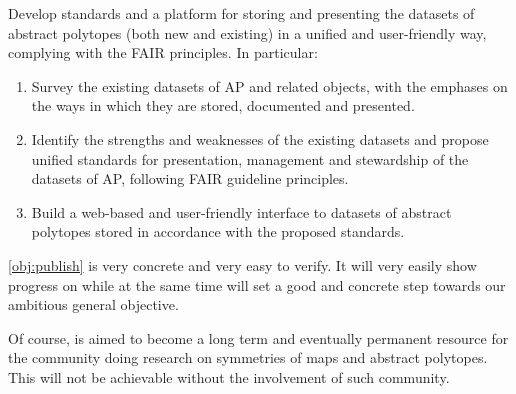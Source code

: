 \begin{obj}\label{obj:publish}
Develop standards and a platform for storing and presenting the datasets of abstract polytopes
 (both new and existing) in a unified and user-friendly way, complying with the FAIR principles. In particular:
\begin{enumerate}[label=\textit{(\roman*)}]
\item  Survey the existing datasets of AP and related objects, with the emphases on the ways in which they are stored, documented and presented.
\item
Identify the strengths and weaknesses of the existing datasets and propose unified standards for presentation, management and stewardship of the
datasets of AP, following FAIR guideline principles.
\item Build a web-based and user-friendly interface to datasets of abstract polytopes stored in accordance with the proposed standards.
\end{enumerate}
\end{obj}

\cref{obj:publish} is very concrete and very easy to verify.
It will very easily show progress on \ourp  while at the same time will set a good and concrete step towards our ambitious general objective.

Of course, \ourp  is aimed to become a long term and eventually permanent resource for the community doing research on symmetries of maps and abstract polytopes.
This will not be achievable without the involvement of such community.

